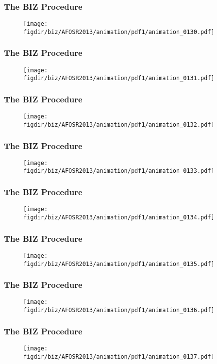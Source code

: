 \documentclass[13pt]{beamer}
\newcommand{\figdir}{../../fig}
\begin{document}
{\begin{frame}\frametitle{The BIZ Procedure}\begin{figure}\texttt{[image: \\figdir/biz/AFOSR2013/animation/pdf1/animation\_0130.pdf]}\end{figure}\end{frame}
\begin{frame}\frametitle{The BIZ Procedure}\begin{figure}\texttt{[image: \\figdir/biz/AFOSR2013/animation/pdf1/animation\_0131.pdf]}\end{figure}\end{frame}
\begin{frame}\frametitle{The BIZ Procedure}\begin{figure}\texttt{[image: \\figdir/biz/AFOSR2013/animation/pdf1/animation\_0132.pdf]}\end{figure}\end{frame}
\begin{frame}\frametitle{The BIZ Procedure}\begin{figure}\texttt{[image: \\figdir/biz/AFOSR2013/animation/pdf1/animation\_0133.pdf]}\end{figure}\end{frame}
\begin{frame}\frametitle{The BIZ Procedure}\begin{figure}\texttt{[image: \\figdir/biz/AFOSR2013/animation/pdf1/animation\_0134.pdf]}\end{figure}\end{frame}
\begin{frame}\frametitle{The BIZ Procedure}\begin{figure}\texttt{[image: \\figdir/biz/AFOSR2013/animation/pdf1/animation\_0135.pdf]}\end{figure}\end{frame}
\begin{frame}\frametitle{The BIZ Procedure}\begin{figure}\texttt{[image: \\figdir/biz/AFOSR2013/animation/pdf1/animation\_0136.pdf]}\end{figure}\end{frame}
\begin{frame}\frametitle{The BIZ Procedure}\begin{figure}\texttt{[image: \\figdir/biz/AFOSR2013/animation/pdf1/animation\_0137.pdf]}\end{figure}\end{frame}
}
\end{document}

